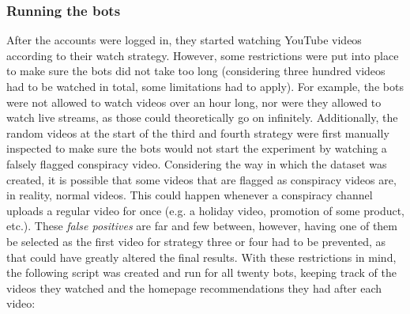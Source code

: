 \documentclass[../main.tex]{subfiles}
\begin{document}
\subsubsection{Running the bots}
After the accounts were logged in, they started watching YouTube videos according to their watch
strategy. However, some restrictions were put into place to make sure the bots did not take too long
(considering three hundred videos had to be watched in total, some limitations had to apply). For
example, the bots were not allowed to watch videos over an hour long, nor were they allowed to watch live
streams, as those could theoretically go on infinitely. Additionally, the random videos at the start of
the third and fourth strategy were first manually inspected to make sure the bots would not start the
experiment by watching a falsely flagged conspiracy video. Considering the way in which the dataset was
created, it is possible that some videos that are flagged as conspiracy videos are, in reality, normal 
videos. This could happen whenever a conspiracy channel uploads a regular video for once (e.g. a holiday 
video, promotion of some product, etc.). These \textit{false positives} are far and few between, however,
having one of them be selected as the first video for strategy three or four had to be prevented, as that
could have greatly altered the final results. With these restrictions in mind, the following script was 
created and run for all twenty bots, keeping track of the videos they watched and the homepage 
recommendations they had after each video:

\vspace{0.25in}

\nolinenumbers
\end{document}
